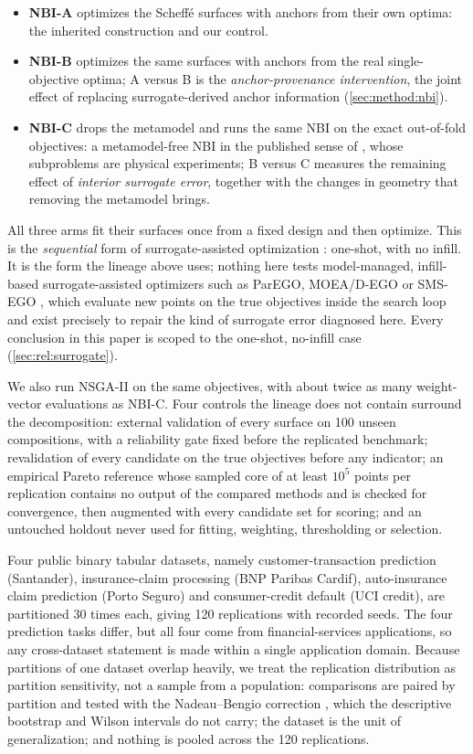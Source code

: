\begin{itemize}
\item \textbf{NBI-A} optimizes the Scheffé surfaces with anchors from their own optima: the inherited construction and
our control.
\item \textbf{NBI-B} optimizes the same surfaces with anchors from the real single-objective optima; A versus B
is the \emph{anchor-provenance intervention}, the joint effect of replacing surrogate-derived anchor information
(\cref{sec:method:nbi}).
\item \textbf{NBI-C} drops the metamodel and runs the same NBI on the exact out-of-fold objectives: a
metamodel-free NBI in the published sense of \citet{gellerich2023doenbi}, whose subproblems are physical experiments;
B versus C measures the remaining effect of \emph{interior surrogate error}, together with the changes in geometry
that removing the metamodel brings.
\end{itemize}

All three arms fit their surfaces once from a fixed design and then optimize. This is the \emph{sequential} form of
surrogate-assisted optimization \citep{tabatabaei2015survey}: one-shot, with no infill. It is the form the
lineage above uses; nothing here tests model-managed, infill-based surrogate-assisted optimizers such as ParEGO,
MOEA/D-EGO or SMS-EGO \citep{knowles2006parego,zhang2010moeadego,ponweiser2008smsego}, which evaluate new points on
the true objectives inside the search loop and exist precisely to repair the kind of surrogate error diagnosed here.
Every conclusion in this paper is scoped to the one-shot, no-infill case (\cref{sec:rel:surrogate}).

We also run NSGA-II on the same objectives, with about twice as many weight-vector evaluations as NBI-C. Four controls
the lineage does not contain surround the decomposition: external validation of every surface on 100 unseen
compositions, with a reliability gate fixed before the replicated benchmark; revalidation of every candidate on the
true objectives before any indicator; an empirical Pareto reference whose sampled core of at least $10^{5}$ points per
replication contains no output of the compared methods and is checked for convergence, then augmented with every
candidate set for scoring; and an untouched holdout never used for fitting, weighting, thresholding or selection.

Four public binary tabular datasets, namely customer-transaction prediction (Santander), insurance-claim processing (BNP
Paribas Cardif), auto-insurance claim prediction (Porto Seguro) and consumer-credit default (UCI credit), are
partitioned 30 times each, giving 120 replications with recorded seeds. The four prediction tasks differ, but all four
come from financial-services applications, so any cross-dataset statement is made within a single application domain.
Because partitions of one dataset overlap heavily, we treat the replication distribution as partition sensitivity, not
a sample from a population: comparisons are paired by partition and tested with the Nadeau--Bengio correction
\citep{nadeau2003inference}, which the descriptive bootstrap and Wilson intervals do not carry; the dataset is the
unit of generalization; and nothing is pooled across the 120 replications.

